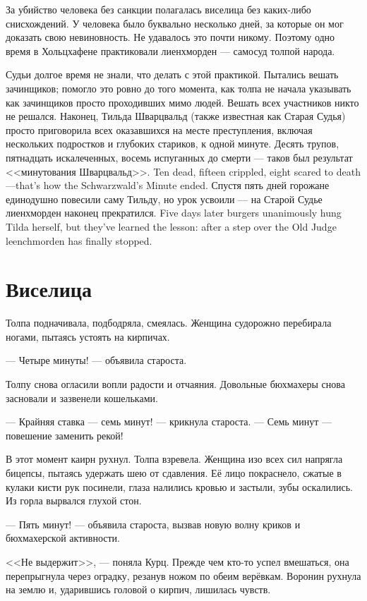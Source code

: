 За убийство человека без санкции полагалась виселица без каких-либо снисхождений.
У человека было буквально несколько дней, за которые он мог доказать свою невиновность.
Не удавалось это почти никому.
Поэтому одно время в Хольцхафене практиковали лиенхморден --- самосуд толпой народа.

Судьи долгое время не знали, что делать с этой практикой.
Пытались вешать зачинщиков;
помогло это ровно до того момента, как толпа не начала указывать как зачинщиков просто проходивших мимо людей.
Вешать всех участников никто не решался.
Наконец, Тильда Шварцвальд (также известная как Старая Судья) просто приговорила всех оказавшихся на месте преступления, включая нескольких подростков и глубоких стариков, к одной минуте.
{Десять трупов, пятнадцать искалеченных, восемь испуганных до смерти --- таков был результат <<минутования Шварцвальд>>.}
{Ten dead, fifteen crippled, eight scared to death---that's how the Schwarzwald's Minute ended.}
{Спустя пять дней горожане единодушно повесили саму Тильду, но урок усвоили --- на Старой Судье лиенхморден наконец прекратился.}
{Five days later burgers unanimously hung Tilda herself, but they've learned the lesson: after a step over the Old Judge leenchmorden has finally stopped.}

\section{Виселица}

Толпа подначивала, подбодряла, смеялась.
Женщина судорожно перебирала ногами, пытаясь устоять на кирпичах.

--- Четыре минуты! --- объявила староста.

Толпу снова огласили вопли радости и отчаяния.
Довольные бюхмахеры снова засновали и зазвенели кошельками.

--- Крайняя ставка --- семь минут! --- крикнула староста.
--- Семь минут --- повешение заменить рекой!

В этот момент каирн рухнул.
Толпа взревела.
Женщина изо всех сил напрягла бицепсы, пытаясь удержать шею от сдавления.
Её лицо покраснело, сжатые в кулаки кисти рук посинели, глаза налились кровью и застыли, зубы оскалились.
Из горла вырвался глухой стон.

--- Пять минут! --- объявила староста, вызвав новую волну криков и бюхмахерской активности.

<<Не выдержит>>, --- поняла Курц.
Прежде чем кто-то успел вмешаться, она перепрыгнула через оградку, резанув ножом по обеим верёвкам.
Воронин рухнула на землю и, ударившись головой о кирпич, лишилась чувств.

